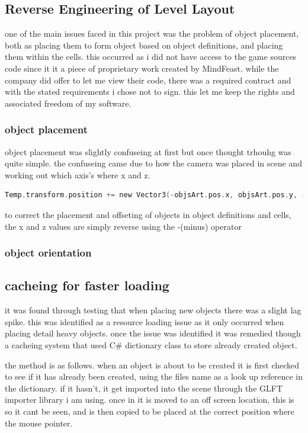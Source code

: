 \subsection{Reverse Engineering of Level Layout}
one of the main issues faced in this project was the problem of object placement, both as placing them to form object based on object definitions, and placing them within the cells. this occurred as i did not have access to the game sources code since it it a piece of proprietary work created by MindFeast. while the company did offer to let me view their code, there was a required contract and with the stated requirements i chose not to sign. this let me keep the rights and associated freedom of my software. 
\subsubsection{object placement}
object placement was slightly confuseing at first but once thought trhouhg was quite simple. the confuseing came due to how the camera was placed in scene and working out which axis's where x and z.
\begin{lstlisting}[language=C, caption=Python example]
Temp.transform.position += new Vector3(-objsArt.pos.x, objsArt.pos.y, -objsArt.pos.z);//position offset
\end{lstlisting}
to correct the placement and offseting of objects in object definitions and cells, the x and z values are simply reverse using the -(minus) operator
\subsubsection{object orientation}

\subsection{cacheing for faster loading}
it was found through testing that when placing new objects there was a slight lag spike. this was identified as a resource loading issue as it only occurred when placing detail heavy objects. once the issue was identified it was remedied though a cacheing system that used C\# dictionary class to store already created object.

the method is as follows. when an object is about to be created it is first checked to see if it has already been created, using the files name as a look up reference in the dictionary. if it hasn't, it get imported into the scene through the GLFT importer library i am using. once in it is moved to an off screen location, this is so it cant be seen, and is then copied to be placed at the correct position where the mouse pointer.

